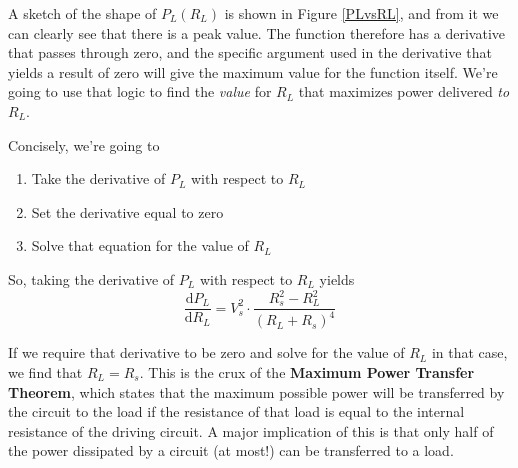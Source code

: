 A sketch of the shape of $P_L(R_L)$ is shown in Figure \ref{PLvsRL}, and from it we can clearly see that there is a peak value. The function therefore has a derivative that passes through zero, and the specific argument used in the derivative that yields a result of zero will give the maximum value for the function itself. We're going to use that logic to find the \textit{value} for $R_L$ that maximizes power delivered \textit{to} $R_L$. 
\par
Concisely, we're going to 
\begin{enumerate}
\item{Take the derivative of $P_L$ with respect to $R_L$}
\item{Set the derivative equal to zero}
\item{Solve that equation for the value of $R_L$}
\end{enumerate}
So, taking the derivative of $P_L$ with respect to $R_L$ yields
$$
\frac{\mathrm{d}{P_L}}{\mathrm{d}R_L} = V_s^2 \cdot \frac{R_s^2-R_L^2}{(R_L + R_s)^4}
$$
\par
If we require that derivative to be zero and solve for the value of $R_L$ in that case, we find that $R_L=R_s$. This is the crux of the \textbf{Maximum Power Transfer Theorem}, which states that the maximum possible power will be transferred by the circuit to the load if the resistance of that load is equal to the internal resistance of the driving circuit. A major implication of this is that only half of the power dissipated by a circuit (at most!) can be transferred to a load.

